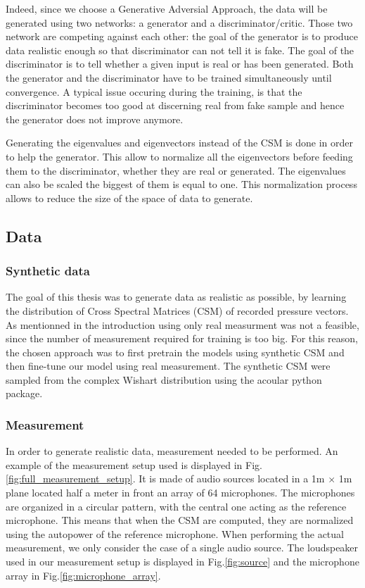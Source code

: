 \documentclass{article}
\begin{document}
Indeed, since we choose a Generative Adversial Approach, the data will be generated using two networks: a generator and a discriminator/critic. Those two network are competing against each other: the goal of the generator is to produce data realistic enough so that discriminator can not tell it is fake. The goal of the discriminator is to tell whether a given input is real or has been generated. Both the generator and the discriminator have to be trained simultaneously until convergence. A typical issue occuring during the training, is that the discriminator becomes too good at discerning real from fake sample and hence the generator does not improve anymore.

Generating the eigenvalues and eigenvectors instead of the CSM is done in order to help the generator. This allow to normalize all the eigenvectors before feeding them to the discriminator, whether they are real or generated. The eigenvalues can also be scaled the biggest of them is equal to one. This normalization process allows to reduce the size of the space of data to generate.



\subsection{Data}

\subsubsection{Synthetic data}

The goal of this thesis was to generate data as realistic as possible, by learning the distribution of Cross Spectral Matrices (CSM) of recorded pressure vectors. As mentionned in the introduction using only real measurment was not a feasible, since the number of measurement required for training is too big. For this reason, the chosen approach was to first pretrain the models using synthetic CSM and then fine-tune our model using real measurement. The synthetic CSM were sampled from the complex Wishart distribution using the acoular python package.


\subsubsection{Measurement}

In order to generate realistic data, measurement needed to be performed. An example of the measurement setup used is displayed in Fig.\ref{fig:full_measurement_setup}. It is made of audio sources located in a 1m $\times$ 1m plane located half a meter in front an array of 64 microphones. The microphones are organized in a circular pattern, with the central one acting as the reference microphone. This means that when the CSM are computed, they are normalized using the autopower of the reference microphone. When performing the actual measurement, we only consider the case of a single audio source. The loudspeaker used in our measurement setup is displayed in Fig.\ref{fig:source} and the microphone array in Fig.\ref{fig:microphone_array}.
\end{document}
